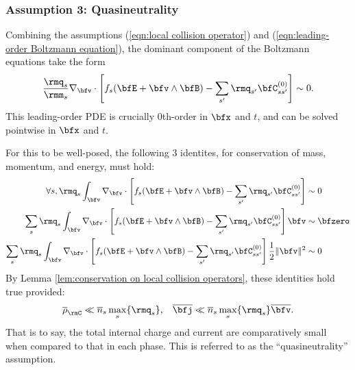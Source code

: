 \subsubsection*{Assumption 3: Quasineutrality}
    Combining the assumptions (\ref{eqn:local collision operator}) and (\ref{eqn:leading-order Boltzmann equation}), the dominant component of the Boltzmann equations take the form
    \begin{equation}\label{eqn:local leading-order Boltzmann equation}
        \frac{\rmq_{s}}{\rmm_{s}}\nabla_{\bfv}\cdot\left[f_{s}(\bfE + \bfv\wedge\bfB) - \sum_{s'}\rmq_{s'}\bfC_{ss'}^{(0)}\right]  \sim  0.
    \end{equation}
    This leading-order PDE is crucially 0th-order in $\bfx$ and $t$, and can be solved pointwise in $\bfx$ and $t$.
    
    For this to be well-posed, the following 3 identites, for conservation of mass, momentum, and energy, must hold:
    \begin{align}
        \forall s,  \rmq_{s}\int_{\bfv}\nabla_{\bfv}\cdot\left[f_{s}(\bfE + \bfv\wedge\bfB) - \sum_{s'}\rmq_{s'}\bfC_{ss'}^{(0)}\right]  &\sim  0  \\
        \sum_{s}\rmq_{s}\int_{\bfv}\nabla_{\bfv}\cdot\left[f_{s}(\bfE + \bfv\wedge\bfB) - \sum_{s'}\rmq_{s'}\bfC_{ss'}^{(0)}\right]\bfv  &\sim  \bfzero  \\
        \sum_{s}\rmq_{s}\int_{\bfv}\nabla_{\bfv}\cdot\left[f_{s}(\bfE + \bfv\wedge\bfB) - \sum_{s'}\rmq_{s'}\bfC_{ss'}^{(0)}\right]\frac{1}{2}\|\bfv\|^{2}  &\sim  0
    \end{align}
    By Lemma \ref{lem:conservation on local collision operators}, these identities hold true provided:
    \begin{align}\label{eqn:quasineutrality}
        \overline{\rho}_{\rmC}  \ll \overline{n}_{s}\max_{s}\{\rmq_{s}\},  &&
        \overline{\bfj}         \ll  \overline{n}_{s}\max_{s}\{\rmq_{s}\}\overline{\bfv}.
    \end{align}
    That is to say, the total internal charge and current are comparatively small when compared to that in each phase. This is referred to as the ``quasineutrality'' assumption.
    